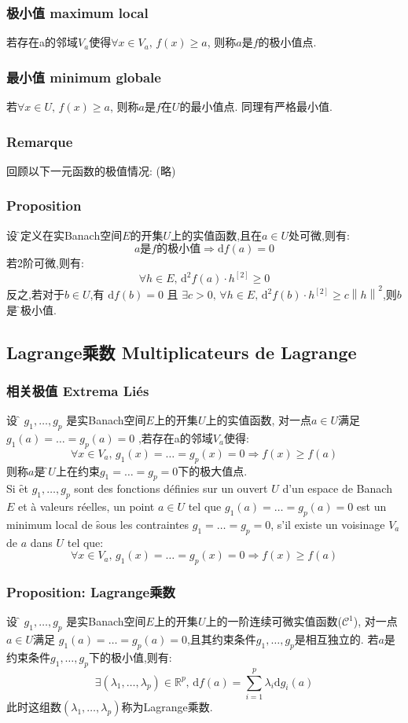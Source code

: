 \documentclass[12pt, a4paper, oneside]{ctexbook}
\newcommand{\di }{\text{d}}%
\newcommand{\R }{\mathbb{R}}%
\newcommand{\C }{\mathcal{C}}%
\begin{document}
  \subsubsection{极小值 maximum local}
  若存在a的邻域$V_a$使得$\forall x\in V_a,\,f(x)\geq a$,
  则称$a$是$f$的极小值点.
  \subsubsection{最小值 minimum globale}
  若$\forall x\in U,\,f(x)\geq a$,
  则称$a$是$f$在$U$的最小值点.
  同理有严格最小值.
  \subsubsection{Remarque}
  回顾以下一元函数的极值情况:
  (略)
  \subsubsection{Proposition}
  设\f 是定义在实Banach空间$E$的开集$U$上的实值函数,且在$a\in U$处可微,则有:
  $$
  a\text{是}f\text{的极小值}\Rightarrow \di f(a)=0
  $$
  若\f 2阶可微,则有:
  $$
  \forall h\in E,\,\di^2f(a)\cdot h^{[2]}\geq 0
  $$
  反之,若对于$b\in U$,有 $\di f(b)=0$ 且 
  $\exists c>0,\,\forall h\in E,\,\di^2f(b)\cdot h^{[2]}\ge c\left\lVert h\right\rVert^2$,则$b$是\f 的极小值.
  \subsection{Lagrange乘数 Multiplicateurs de Lagrange}
  \subsubsection{相关极值 Extrema Liés}
  设\f 和 $g_1,\dots,g_p$ 是实Banach空间$E$上的开集$U$上的实值函数,
  对一点$a\in U$满足 $g_1(a)=\dots=g_p(a)=0$ ,若存在a的邻域$V_a$使得:
  $$
  \forall x\in V_a,\,g_1(x)=\dots=g_p(x)=0\Rightarrow f(x)\geq f(a)
  $$
  则称$a$是\f 在$U$上在约束$g_1=\dots=g_p=0$下的极大值点.\\
  \indent
  Si \f et $g_1,\dots,g_p$ sont des fonctions définies sur un ouvert $U$ d'un espace de Banach $E$ et à valeurs réelles, 
  un point $a\in U$ tel que $g_1(a)=\dots=g_p(a)=0$ est un minimum local de \f sous les contraintes $g_1=\dots=g_p=0$,
  s'il existe un voisinage $V_a$ de $a$ dans $U$ tel que:
  $$
  \forall x\in V_a,\,g_1(x)=\dots=g_p(x)=0\Rightarrow f(x)\geq f(a)
  $$
  \subsubsection{Proposition: Lagrange乘数}
  设\f 和 $g_1,\dots,g_p$ 是实Banach空间$E$上的开集$U$上的一阶连续可微实值函数($\C^1$),
  对一点$a\in U$满足 $g_1(a)=\dots=g_p(a)=0$,且其约束条件$g_1,\dots,g_p$是相互独立的.
  若$a$是约束条件$g_1,\dots,g_p$下的极小值,则有:
  $$
  \exists (\lambda_1,\dots,\lambda_p)\in\R^p,\,\di f(a)=\sum_{i=1}^{p}\lambda_i\di g_i(a)
  $$
  此时这组数$(\lambda_1,\dots,\lambda_p)$称为Lagrange乘数.
\end{document}
